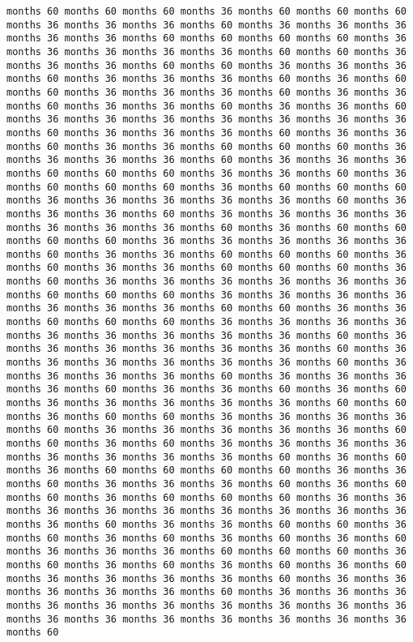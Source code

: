 \documentclass[11pt]{article}
\begin{document}
\begin{Verbatim}[commandchars=\\\{\}, frame=single, framerule=2mm, rulecolor=\color{outerrorbackground}]
months 60 months 60 months 60 months 36 months 60 months 60 months 60 months 36 months 36 months 36 months 60 months 36 months 36 months 36 months 36 months 36 months 60 months 60 months 60 months 60 months 36 months 36 months 36 months 36 months 36 months 60 months 60 months 36 months 36 months 36 months 60 months 60 months 36 months 36 months 36 months 60 months 36 months 36 months 36 months 60 months 36 months 60 months 60 months 36 months 36 months 36 months 60 months 36 months 36 months 60 months 36 months 36 months 60 months 36 months 36 months 60 months 36 months 36 months 36 months 36 months 36 months 36 months 36 months 60 months 36 months 36 months 36 months 60 months 36 months 36 months 60 months 36 months 36 months 60 months 60 months 60 months 36 months 36 months 36 months 36 months 60 months 36 months 36 months 36 months 60 months 60 months 60 months 36 months 36 months 60 months 36 months 60 months 60 months 60 months 36 months 60 months 60 months 60 months 36 months 36 months 36 months 36 months 36 months 60 months 36 months 36 months 36 months 60 months 36 months 36 months 36 months 36 months 36 months 36 months 36 months 60 months 36 months 60 months 60 months 60 months 60 months 36 months 36 months 36 months 36 months 36 months 60 months 36 months 36 months 60 months 60 months 60 months 36 months 60 months 36 months 36 months 60 months 60 months 60 months 36 months 60 months 36 months 36 months 36 months 36 months 36 months 36 months 60 months 60 months 60 months 36 months 36 months 36 months 36 months 36 months 36 months 36 months 60 months 60 months 36 months 36 months 60 months 60 months 60 months 36 months 36 months 36 months 36 months 36 months 36 months 36 months 36 months 36 months 60 months 36 months 36 months 36 months 36 months 36 months 36 months 60 months 36 months 36 months 36 months 36 months 36 months 36 months 60 months 36 months 36 months 36 months 36 months 60 months 36 months 36 months 36 months 36 months 60 months 36 months 36 months 60 months 36 months 60 months 36 months 36 months 36 months 36 months 36 months 60 months 60 months 36 months 60 months 60 months 36 months 36 months 36 months 36 months 60 months 36 months 36 months 36 months 36 months 36 months 60 months 60 months 36 months 60 months 36 months 36 months 36 months 36 months 36 months 36 months 36 months 36 months 60 months 36 months 60 months 36 months 60 months 60 months 60 months 60 months 36 months 36 months 60 months 36 months 36 months 36 months 60 months 36 months 60 months 60 months 36 months 60 months 60 months 60 months 36 months 36 months 36 months 36 months 36 months 36 months 36 months 36 months 36 months 36 months 60 months 36 months 36 months 60 months 60 months 36 months 60 months 36 months 60 months 36 months 60 months 36 months 60 months 36 months 36 months 36 months 60 months 60 months 60 months 36 months 60 months 36 months 60 months 36 months 60 months 36 months 60 months 36 months 36 months 36 months 36 months 60 months 36 months 36 months 36 months 36 months 36 months 60 months 36 months 36 months 36 months 36 months 36 months 36 months 36 months 36 months 36 months 36 months 36 months 36 months 36 months 36 months 36 months 36 months 36 months 60 
\end{Verbatim}
\end{document}
